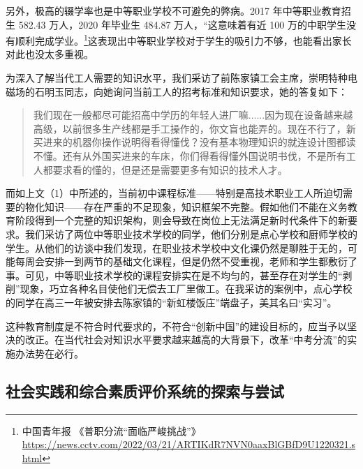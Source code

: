 \documentclass[12pt,UTF8]{ctexart}
\begin{document}
\par {
	另外，极高的辍学率也是中等职业学校不可避免的弊病。2017 年中等职业教育招生 582.43 万人，2020 年毕业生 484.87  万人，“这意味着有近
	100 万的中职学生没有顺利完成学业。\footnote{中国青年报
		《普职分流“面临严峻挑战”》\url{https://news.cctv.com/2022/03/21/ARTIKdR7NVN0aaxBlGBfD9U1220321.shtml}}这表现出中等职业学校对于学生的吸引力不够，也能看出家长对此也没太多重视。
}
\par {
	为深入了解当代工人需要的知识水平，我们采访了前陈家镇工会主席，崇明特种电磁场的石明玉同志，向她询问当前工人的招考标准和知识要求，她的答复如下：
	\begin{quote}
		\kaishu
		我们现在一般都尽可能招高中学历的年轻人进厂嘛......因为现在设备越来越高级，以前很多生产线都是手工操作的，你文盲也能弄的。现在不行了，新买进来的机器你操作说明得看得懂伐？没有基本物理知识的就连设计图都读不懂。还有从外国买进来的车床，你们得看得懂外国说明书伐，不是所有工人都要求看的懂的，但是还是需要更多有知识的技术人才。
	\end{quote}
}
\par {
	
	而如上文（1）中所述的，当前初中课程标准——特别是高技术职业工人所迫切需要的物化知识——存在严重的不足现象，知识框架不完整。假如他们不能在义务教育阶段得到一个完整的知识架构，则会导致在岗位上无法满足新时代条件下的新要求。我们采访了两位中等职业技术学校的同学，他们分别是点心学校和厨师学校的学生。从他们的访谈中我们发现，在职业技术学校中文化课仍然是聊胜于无的，可能每周会安排一到两节的基础文化课程，但是仍然不受重视，老师和学生都敷衍了事。可见，中等职业技术学校的课程安排实在是不均匀的，甚至存在对学生的“剥削”现象，巧立各种名目使他们无偿去工厂里做工。在我采访的案例中，点心学校的同学在高三一年被安排去陈家镇的“新虹楼饭庄”端盘子，美其名曰“实习”。
}
\par {
	
	这种教育制度是不符合时代要求的，不符合“创新中国”的建设目标的，应当予以坚决的改正。在当代社会对知识水平要求越来越高的大背景下，改革“中考分流”的实施办法势在必行。
}


\subsection {社会实践和综合素质评价系统的探索与尝试}
\end{document}

